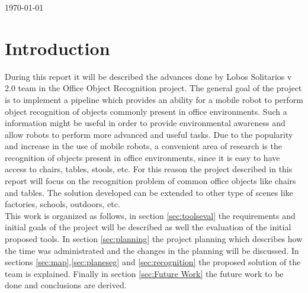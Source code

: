 \documentclass[fontsize=12pt]{article}
\begin{document}
\begin{titlepage}


{\large \today}\\[3cm] %


 

\vfill %

\end{titlepage}
\tableofcontents
\pagebreak[4]
\section{Introduction}\label{sec:intro}
During this report it will be described the advances done by Lobos Solitarios v 2.0 team in the Office Object Recognition project. The general goal of the project is to implement a pipeline which provides an ability for a mobile robot to perform object recognition of objects commonly present in office environments. Such a information might be useful in order to provide environmental awareness and allow robots to perform more advanced and useful tasks. Due to the popularity and increase in the use of mobile robots, a convenient area of research is the recognition of objects present in office environments, since it is easy to have access to chairs, tables, stools, etc. For this reason the project described in this report will focus on the recognition problem of common office objects like chairs and tables. The solution developed can be extended to other type of scenes like factories, schools, outdoors, etc.  \\ 
This work is organized as follows, in section \ref{sec:toolseval} the requirements and initial goals of the project will be described as well the evaluation of the initial proposed tools. In section \ref{sec:planning}  the project planning which describes how the time was administrated and the changes in the planning will be discussed. In sections \ref{sec:map},\ref{sec:planeseg} and \ref{sec:recognition} the proposed solution of the team is explained. Finally in section \ref{sec:Future Work} the future work to be done and conclusions are  derived. 
\end{document}
